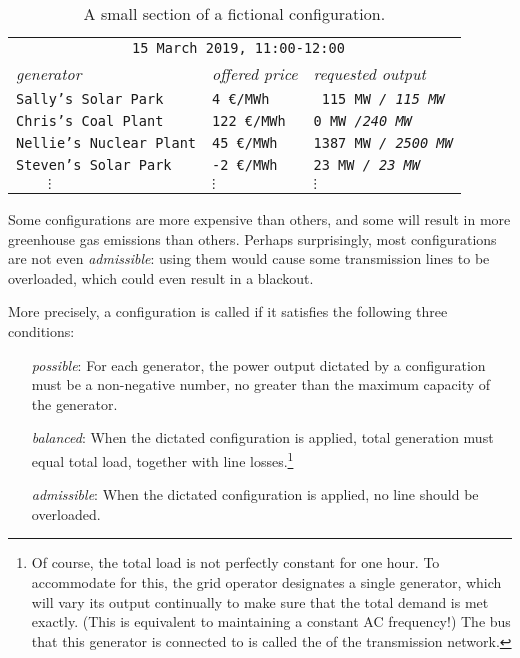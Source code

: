 \documentclass[main.tex]{subfiles}
\begin{document}
\begin{table}[t]
    \centering
\begin{tabular}{l@{\hskip 2em}l@{\hskip 2em}l}
\toprule
    \multicolumn{3}{c}{\texttt{%
    15 March 2019, 11:00-12:00}}\\[.5em]
    \emph{generator} & \emph{offered price} & \emph{requested output} \\
\midrule
    \texttt{Sally's Solar Park} & \texttt{\hphantom{xx}4 \euro/MWh}  & \texttt{ 115 MW \emph{/ \hphantom{x}115 MW}} \\
    \texttt{Chris's Coal Plant} & \texttt{122 \euro/MWh}  & \texttt{\hphantom{xxx}0 MW \emph{/\hphantom{xx}240 MW}} \\
    \texttt{Nellie's Nuclear Plant} & \texttt{\hphantom{x}45 \euro/MWh}  & \texttt{1387 MW \emph{/ 2500 MW}} \\
    \texttt{Steven's Solar Park} & \texttt{\hphantom{x}-2 \euro/MWh}  & \texttt{\hphantom{xx}23 MW \emph{/ \hphantom{xx}23 MW}} \\
    $\qquad\vdots$ & \texttt{\hphantom{xx}}$\vdots$  & \texttt{\hphantom{xxx}}$\vdots$ \\
\bottomrule
\end{tabular}
    \caption{A small section of a fictional configuration.}
    \label{tab:sampleconfiguration}
\end{table}


Some configurations are more expensive than others, and some will result in more greenhouse gas emissions than others. Perhaps surprisingly, most configurations are not even \emph{admissible}: using them would cause some transmission lines to be overloaded, which could even result in a blackout. 

More precisely, a configuration is called  if it satisfies the following three conditions:
\begin{itemize}[labelwidth =, leftmargin = !]
    \item[\emph{possible}\index{configuration!possible}:] For each generator, the power output dictated by a configuration must be a non-negative number, no greater than the maximum capacity of the generator.
    \item[\emph{balanced}\index{configuration!balanced}:] When the dictated configuration is applied, total generation must equal total load, together with line losses.\footnote{Of course, the total load is not perfectly constant for one hour. To accommodate for this, the grid operator designates a single  generator, which will vary its output continually to make sure that the total demand is met exactly. (This is equivalent to maintaining a constant AC frequency!) The bus that this generator is connected to is called the  of the transmission network.}
    \item[\emph{admissible}\index{configuration!admissible}:] When the dictated configuration is applied, no line should be overloaded.
\end{itemize}
\end{document}
